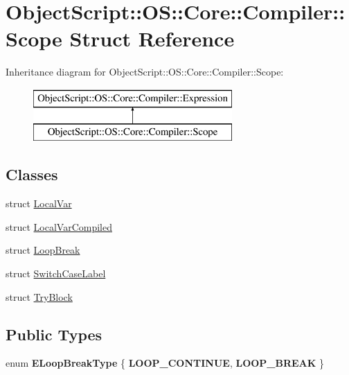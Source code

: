 \hypertarget{struct_object_script_1_1_o_s_1_1_core_1_1_compiler_1_1_scope}{}\section{Object\+Script\+:\+:OS\+:\+:Core\+:\+:Compiler\+:\+:Scope Struct Reference}
\label{struct_object_script_1_1_o_s_1_1_core_1_1_compiler_1_1_scope}
Inheritance diagram for Object\+Script\+:\+:OS\+:\+:Core\+:\+:Compiler\+:\+:Scope\+:\begin{figure}[H]
\begin{center}
\leavevmode
\includegraphics[height=2.000000cm]{struct_object_script_1_1_o_s_1_1_core_1_1_compiler_1_1_scope}
\end{center}
\end{figure}
\subsection*{Classes}
\begin{DoxyCompactItemize}
\item 
struct \hyperlink{struct_object_script_1_1_o_s_1_1_core_1_1_compiler_1_1_scope_1_1_local_var}{Local\+Var}
\item 
struct \hyperlink{struct_object_script_1_1_o_s_1_1_core_1_1_compiler_1_1_scope_1_1_local_var_compiled}{Local\+Var\+Compiled}
\item 
struct \hyperlink{struct_object_script_1_1_o_s_1_1_core_1_1_compiler_1_1_scope_1_1_loop_break}{Loop\+Break}
\item 
struct \hyperlink{struct_object_script_1_1_o_s_1_1_core_1_1_compiler_1_1_scope_1_1_switch_case_label}{Switch\+Case\+Label}
\item 
struct \hyperlink{struct_object_script_1_1_o_s_1_1_core_1_1_compiler_1_1_scope_1_1_try_block}{Try\+Block}
\end{DoxyCompactItemize}
\subsection*{Public Types}
\begin{DoxyCompactItemize}
\item 
enum {\bfseries E\+Loop\+Break\+Type} \{ {\bfseries L\+O\+O\+P\+\_\+\+C\+O\+N\+T\+I\+N\+UE}, 
{\bfseries L\+O\+O\+P\+\_\+\+B\+R\+E\+AK}
 \}\hypertarget{struct_object_script_1_1_o_s_1_1_core_1_1_compiler_1_1_scope_a9224d798c113aa6b684deae1f3a7b544}{}\label{struct_object_script_1_1_o_s_1_1_core_1_1_compiler_1_1_scope_a9224d798c113aa6b684deae1f3a7b544}

\end{DoxyCompactItemize}

